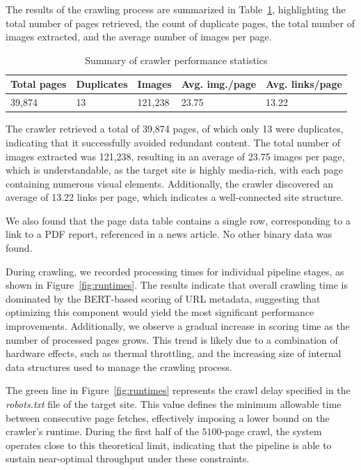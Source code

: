 \documentclass[conference]{IEEEtran}
\begin{document}
The results of the crawling process are summarized in Table~\ref{tab:crawler-stats}, highlighting the total number of pages retrieved, the count of duplicate pages, the total number of images extracted, and the average number of images per page.

\begin{table}[H]
\centering
\caption{Summary of crawler performance statistics}
\label{tab:crawler-stats}
\begin{tabular}{l|l|l|l|l}
\hline
Total pages & Duplicates & Images & Avg. img./page & Avg. links/page \\
\hline
39,874 & 13 & 121,238 & 23.75 & 13.22 \\
\hline
\end{tabular}
\end{table}

The crawler retrieved a total of 39,874 pages, of which only 13 were duplicates, indicating that it successfully avoided redundant content. The total number of images extracted was 121,238, resulting in an average of 23.75 images per page, which is understandable, as the target site is highly media-rich, with each page containing numerous visual elements. Additionally, the crawler discovered an average of 13.22 links per page, which indicates a well-connected site structure.

We also found that the page data table contains a single row, corresponding to a link to a PDF report, referenced in a news article. No other binary data was found.

During crawling, we recorded processing times for individual pipeline stages, as shown in Figure~\ref{fig:runtimes}. The results indicate that overall crawling time is dominated by the BERT-based scoring of URL metadata, suggesting that optimizing this component would yield the most significant performance improvements. Additionally, we observe a gradual increase in scoring time as the number of processed pages grows. This trend is likely due to a combination of hardware effects, such as thermal throttling, and the increasing size of internal data structures used to manage the crawling process.

The green line in Figure~\ref{fig:runtimes} represents the crawl delay specified in the \textit{robots.txt} file of the target site. This value defines the minimum allowable time between consecutive page fetches, effectively imposing a lower bound on the crawler’s runtime. During the first half of the $5100$-page crawl, the system operates close to this theoretical limit, indicating that the pipeline is able to sustain near-optimal throughput under these constraints.
\end{document}
